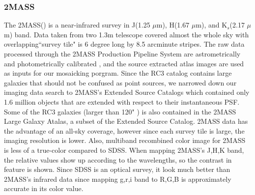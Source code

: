 \documentclass[authoryear, 12pt,5p, times]{elsarticle}
\begin{document}
	\subsubsection{2MASS}
	 The 2MASS(\citealp{2mass}) is a near-infrared survey in J(1.25 $\mu$m), H(1.67 $\mu$m), and K$_s$(2.17 $\mu$m) band. Data taken from two 1.3m telescope covered almost the whole sky with  overlapping``survey tile" is 6 degree long by 8.5 arcminute stripes.
 The raw data processed through the 2MASS Production Pipeline System are astrometrically and photometrically calibrated , and the source extracted atlas images are used as inputs for our mosaicking porgram. Since the RC3 catalog contains large galaxies that should not be confused as point sources, we narrowed down our imaging data search to 2MASS's Extended Source Catalogs which contained only 1.6 million objects that are extended with respect to their instantaneous PSF. Some of the RC3 galaxies (larger than 120" ) is also contained in the 2MASS Large Galaxy Atalas, a subset of the Extended Source Catalog.%
2MASS data has the advantage of an  all-sky coverage, however since each survey tile is large, the imaging resolution is lower. Also, multiband recombined color image for 2MASS is less of a true-color compared to SDSS. When mapping 2MASS's J,H,K band, the relative values show up according to the wavelengths, so the contrast in feature is shown. Since  SDSS is an optical survey, it look much better than 2MASS's infrared data since mapping g,r,i band to R,G,B is approximately accurate in its color value. 
\end{document}
